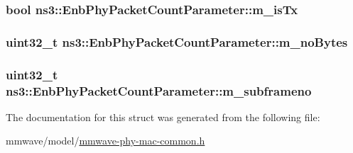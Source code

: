 \subsubsection[{\texorpdfstring{m\+\_\+is\+Tx}{m_isTx}}]{\setlength{\rightskip}{0pt plus 5cm}bool ns3\+::\+Enb\+Phy\+Packet\+Count\+Parameter\+::m\+\_\+is\+Tx}\hypertarget{structns3_1_1EnbPhyPacketCountParameter_ae978daa50e1592a153d29221355ff974}{}\label{structns3_1_1EnbPhyPacketCountParameter_ae978daa50e1592a153d29221355ff974}
\subsubsection[{\texorpdfstring{m\+\_\+no\+Bytes}{m_noBytes}}]{\setlength{\rightskip}{0pt plus 5cm}uint32\+\_\+t ns3\+::\+Enb\+Phy\+Packet\+Count\+Parameter\+::m\+\_\+no\+Bytes}\hypertarget{structns3_1_1EnbPhyPacketCountParameter_a6788c6868b87f959d52f388e999d0d27}{}\label{structns3_1_1EnbPhyPacketCountParameter_a6788c6868b87f959d52f388e999d0d27}
\subsubsection[{\texorpdfstring{m\+\_\+subframeno}{m_subframeno}}]{\setlength{\rightskip}{0pt plus 5cm}uint32\+\_\+t ns3\+::\+Enb\+Phy\+Packet\+Count\+Parameter\+::m\+\_\+subframeno}\hypertarget{structns3_1_1EnbPhyPacketCountParameter_a325c11e2d4346bcda543bfcad6a4a99b}{}\label{structns3_1_1EnbPhyPacketCountParameter_a325c11e2d4346bcda543bfcad6a4a99b}


The documentation for this struct was generated from the following file\+:\begin{DoxyCompactItemize}
\item 
mmwave/model/\hyperlink{mmwave-phy-mac-common_8h}{mmwave-\/phy-\/mac-\/common.\+h}\end{DoxyCompactItemize}
